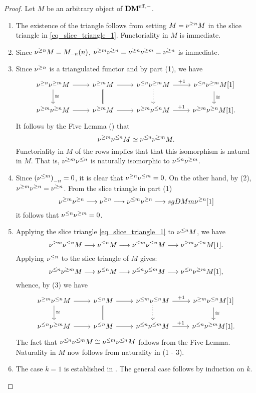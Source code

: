 \begin{proof}
Let $M$ be an arbitrary object of $\DMeff$.

\begin{enumerate}
\item The existence of the triangle follows from setting $M = 
\sgDM{n} M$ in the slice triangle in \eqref{eq_slice_triangle_1}. 
Functoriality in $M$ is immediate.

\item Since $\sgDM{n}M = \tZ[n]{\hZ[n]{M}}$, $\sgDM{m}\sgDM{n} = 
\sgDM{n}\sgDM{m} = \sgDM{n}$ is immediate.

\item Since $\sgDM{n}$ is a triangulated functor and by part (1),
we have
\[
\begin{tikzcd}
\sgDM{n} \sgDM{m} M \arrow{r} \arrow{d}{\cong} &
\sgDM{m} M \arrow{r} \arrow[equals]{d} &
\slDM{n} \sgDM{m} M \arrow{r}{+1} \arrow[dotted]{d} &
\slDM{n} \sgDM{m} M[1] \arrow{d}{\cong}\\
\sgDM{m} \sgDM{n} M \arrow{r} &
\sgDM{m} M \arrow{r} &
\sgDM{m} \slDM{n} M \arrow{r}{+1} &
\sgDM{m} \sgDM{n} M[1].
\end{tikzcd}
\]
It follows by the Five Lemma (\cite[10.2.2]{WH}) that 
\[
\sgDM{m}\slDM{n} M \simeq \slDM{n}\sgDM{m} M.
\]
Functoriality in $M$ of the rows implies that that this 
isomorphism is natural in $M$. That is, $\sgDM{m} \slDM{n}$ is 
naturally isomorphic to $\slDM{n} \sgDM{m}$.

\item Since $\hZ[n]{(\slDM{m})} = 0$, it is clear that
$\sgDM{n}\slDM{m} = 0$. On the other hand, by (2), $\sgDM{m}\sgDM{n}
= \sgDM{n}$. From the slice triangle in part (1)
\[
\sgDM{m} \sgDM{n} \to \sgDM{n} \to \slDM{m} \sgDM{n} \to sgDM{m} 
   \sgDM{n}[1]
\]
it follows that $\slDM{n} \sgDM{m} = 0$.

\item Applying the slice triangle \eqref{eq_slice_triangle_1} to
$\slDM{n} M$, we have
\[
\sgDM{m} \slDM{n} M \to \slDM{n} M \to \slDM{m} \slDM{n} M \to
\sgDM{m} \slDM{n} M[1].
\]
Applying $\slDM{n}$ to the slice triangle of $M$ gives:
\[
\slDM{n} \sgDM{m} M \to \slDM{n} M \to \slDM{n} \slDM{m} M \to
\slDM{n} \sgDM{m} M[1],
\]
whence, by (3) we have
\[
\begin{tikzcd}
\sgDM{m} \slDM{n} M \arrow{r} \arrow{d}{\cong} &
\slDM{n} M \arrow{r} \arrow[equals]{d} &
\slDM{m} \slDM{n} M \arrow{r}{+1} \arrow[dotted]{d} &
\sgDM{m} \slDM{n} M[1] \arrow{d}{\cong}\\
\slDM{n} \sgDM{m} M \arrow{r} &
\slDM{n} M \arrow{r} &
\slDM{n} \slDM{m} M \arrow{r}{+1} &
\slDM{n} \sgDM{m} M[1].
\end{tikzcd}
\]
The fact that $\slDM{n} \slDM{m} M \cong \slDM{m} \slDM{n} M$
follows from the Five Lemma. Naturality in $M$ now follows from
naturality in (1 - 3).

\item The case $k = 1$ is established in \cite[Cor. 1.4]{HuKa}.
The general case follows by induction on $k$.

\end{enumerate}
\end{proof}

